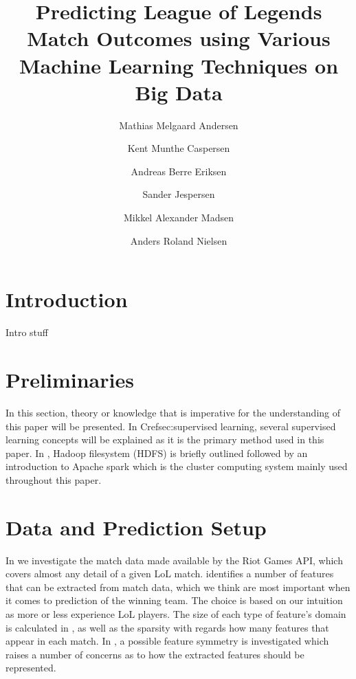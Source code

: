 \documentclass[columns=,boxcolor=white]{datart}
\title{Predicting League of Legends Match Outcomes using Various Machine Learning Techniques on Big Data}
\date{}
\author{Mathias Melgaard Andersen}
\author{Kent Munthe Caspersen}
\author{Andreas Berre Eriksen}
\author{Sander Jespersen}
\author{Mikkel Alexander Madsen}
\author{Anders Roland Nielsen}
\affil{Department of Computer Science, Aalborg University}
\begin{document}
\usetikzlibrary{arrows,intersections,shapes.geometric,calc}
\maketitle



\section{Introduction}\label{sec:intro}
Intro stuff





\section{Preliminaries}\label{sec:prelim}
In this section, theory or knowledge that is imperative for the understanding of this paper will be presented. In Cref{sec:supervised learning}, several supervised learning concepts will be explained as it is the primary method used in this paper. In , Hadoop filesystem (HDFS) is briefly outlined followed by an introduction to Apache spark which is the cluster computing system mainly used throughout this paper.




\section{Data and Prediction Setup}\label{sec:features}
In  we investigate the match data made available by the Riot Games API, which covers almost any detail of a given LoL match.
 identifies a number of features that can be extracted from match data, which we think are most important when it comes to prediction of the winning team. The choice is based on our intuition as more or less experience LoL players. The size of each type of feature's domain is calculated in , as well as the sparsity with regards how many features that appear in each match.
In , a possible feature symmetry is investigated which raises a number of concerns as to how the extracted features should be represented. 



\end{document}
